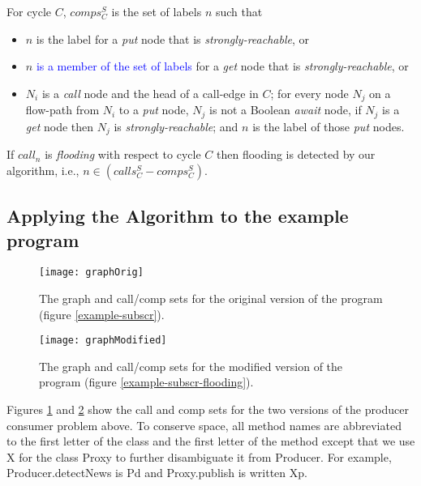 \documentclass[12pt]{article}%
\newcommand{\Blue}[1] {\textcolor{blue}{#1}}%
\newcommand{\callsD}{\ensuremath{\mathit{calls_C^{S}}}\xspace}%
\newcommand{\compsD}{\ensuremath{\mathit{comps_C^{S}}}\xspace}%
\begin{document}
\begin{definition}
\label{defn-comps}
For cycle $C$, \compsD %
 is the set of labels ${n}$ such that 
\begin{itemize}
\item ${n}$ is the label for a \emph{put} node that is \emph{strongly-reachable}, or
\item ${n}$ \Blue{is a member of the set of labels} for a \emph{get} node that is \emph{strongly-reachable}, or 
\item $N_i$ is a \emph{call} node and the head of a call-edge in $C$; 
for every node $N_j$ on a flow-path from $N_i$ to a \emph{put} node,
$N_j$ is not a Boolean \emph{await} node, if $N_j$ is a \emph{get} node then $N_j$ is \emph{strongly-reachable}; 
and $n$ is the label of those \emph{put} nodes.
\end{itemize}
\end{definition}



\begin{theorem}
\label{thm-flooding}
If $call_n$ is \emph{flooding} with respect to cycle $C$ then 
flooding is detected by our algorithm, i.e., $n\in (\callsD -\compsD)$.
\end{theorem}


\subsection{Applying the Algorithm to the example program}


\begin{figure}[t!]
\texttt{[image: graphOrig]}
\caption{\label{graph-orig}
The graph and call/comp sets for the original version of the program (figure \ref{example-subscr}).
}
\end{figure}

\begin{figure}[t]
\texttt{[image: graphModified]}
\caption{\label{graph-modified}
The graph and call/comp sets for the modified version of the program (figure \ref{example-subscr-flooding}).
}
\end{figure}


Figures \ref{graph-orig} and \ref{graph-modified} show the call and comp sets
for the two versions of the producer consumer problem above. To conserve space, all method names are abbreviated to the
first letter of the class and the first letter of the method except that we use X for the class Proxy to further disambiguate it from Producer. 
For example, Producer.detectNews is Pd and Proxy.publish is written Xp.
\end{document}
